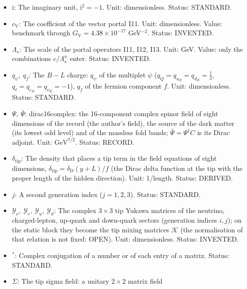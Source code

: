 \documentclass[
  10pt,
]{article}
\begin{document}
\begin{itemize}
  \(i\): The generation index (\(i = 1, 2, 3\)), which also labels the
  neutrino mass states \(\nu_1, \nu_2, \nu_3\); a repeated index is not
  summed unless a sum sign is written. Status: STANDARD.
\item
  \(\mathrm{i}\): The imaginary unit, \(\mathrm{i}^2 = -1\). Unit:
  dimensionless. Status: STANDARD.
\item
  \(c_{\mathrm{V}}\): The coefficient of the vector portal I11. Unit:
  dimensionless. Value: benchmark through
  \(G_{\mathrm{V}} = 4.38\times10^{-17}\) GeV\(^{-2}\). Status:
  INVENTED.
\item
  \(\Lambda_\star\): The scale of the portal operators I11, I12, I13.
  Unit: GeV. Value: only the combinations \(c/\Lambda_\star^n\) enter.
  Status: INVENTED.
\item
  \(q_\psi,\ q_f\): The \(B - L\) charge: \(q_\psi\) of the multiplet
  \(\psi\) (\(q_Q = q_{u_R} = q_{d_R} = \frac13\),
  \(q_\ell = q_{e_R} = q_{\nu_R} = -1\)), \(q_f\) of the fermion
  component \(f\). Unit: dimensionless. Status: STANDARD.
\item
  \(\Psi,\ \bar\Psi\): dirac16complex: the 16-component complex spinor
  field of eight dimensions of the record (the author's field), the
  source of the dark matter (its lowest odd level) and of the massless
  fold bands; \(\bar\Psi = \Psi^\dagger C\) is its Dirac adjoint. Unit:
  \(\mathrm{GeV}^{7/2}\). Status: RECORD.
\item
  \(\delta_{\mathrm{tip}}\): The density that places a tip term in the
  field equations of eight dimensions,
  \(\delta_{\mathrm{tip}} = \delta_{\mathrm{D}}(y + L)/f\) (the Dirac
  delta function at the tip with the proper length of the hidden
  direction). Unit: 1/length. Status: DERIVED.
\item
  \(j\): A second generation index (\(j = 1, 2, 3\)). Status: STANDARD.
\item
  \(\mathcal{Y}_\nu,\ \mathcal{Y}_e,\ \mathcal{Y}_u,\ \mathcal{Y}_d\):
  The complex \(3 \times 3\) tip Yukawa matrices of the neutrino,
  charged-lepton, up-quark and down-quark sectors (generation indices
  \(i, j\)); on the static block they become the tip mixing matrices
  \(\mathcal{K}\) (the normalisation of that relation is not fixed:
  OPEN). Unit: dimensionless. Status: INVENTED.
\item
  \({}^*\): Complex conjugation of a number or of each entry of a
  matrix. Status: STANDARD.
\item
  \(\Sigma\): The tip sigma field: a unitary \(2 \times 2\) matrix field

\end{itemize}
\end{document}
